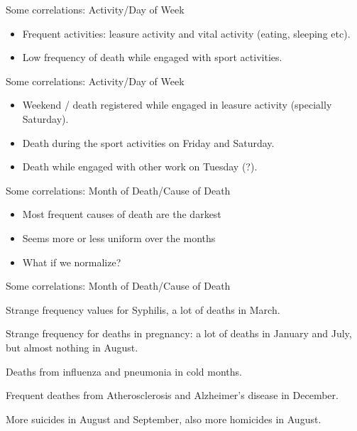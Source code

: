 \documentclass[xcolor=table]{beamer}
\begin{document}
     \begin{frame}{Some correlations: Activity/Day of Week}
     	\begin{itemize}
			\item Frequent activities: leasure activity and vital activity (eating, sleeping etc).
			\item Low frequency of death while engaged with sport activities.
		\end{itemize}
     	\begin{center}
		 \end{center}
     \end{frame}
     
     \begin{frame}{Some correlations: Activity/Day of Week}
     	\begin{itemize}
			\item Weekend / death registered while engaged in leasure activity (specially Saturday).
			\item Death during the sport activities on Friday and Saturday.
			\item Death while engaged with other work on Tuesday (?).
		\end{itemize}
     	\begin{center}
		 \end{center}
     \end{frame}
     
     
     \begin{frame}{Some correlations: Month of Death/Cause of Death}
     	\begin{itemize}
			\item Most frequent causes of death are the darkest
			\item Seems more or less uniform over the months
			\item What if we normalize?
		\end{itemize}
     	\begin{center}
		 \end{center}
     \end{frame}
     
     \begin{frame}{Some correlations: Month of Death/Cause of Death}
     	\begin{itemize}
     	{\tiny
			\item Strange frequency values for Syphilis, a lot of deaths in March.
			\item Strange frequency for deaths in pregnancy: a lot of deaths in January and July, but almost nothing in August.
			\item Deaths from influenza and pneumonia in cold months.
			\item Frequent deathes from Atherosclerosis and Alzheimer's disease in December.
			\item More suicides in August and September, also more homicides in August.
		}
		\end{itemize}
     	\begin{center}
		 \end{center}
     \end{frame}
\end{document}
